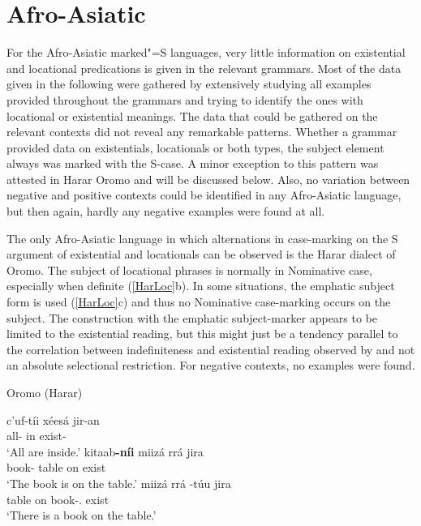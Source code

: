 \section{Afro-Asiatic}\label{ExistAfro}

For the Afro-Asiatic marked"=S languages, very little information on existential and locational predications is given in the relevant grammars. 
Most of the data given in the following were gathered by extensively studying all examples provided throughout the grammars and trying to identify the ones with locational or existential meanings.
The data that could be gathered on the relevant contexts did not reveal any remarkable patterns. 
Whether a grammar provided data on existentials, locationals or both types, the subject element always was marked with the S-case. 
A minor exception to this pattern was attested in Harar Oromo and will be discussed below.
Also, no variation between negative and positive contexts could be identified in any Afro-Asiatic language, but then again, hardly any negative examples were found at all.

The only Afro-Asiatic language in which alternations in case-marking on the S argument of existential and locationals can be observed is the Harar dialect of Oromo. 
The subject of locational phrases is normally in Nominative case, especially when definite (\ref{HarLoc}b). 
In some situations, the emphatic subject form is used (\ref{HarLoc}c) and thus no Nominative case-marking occurs on the subject. 
The construction with the emphatic subject-marker appears to be limited to the existential reading, but this might just be a tendency parallel to the correlation between indefiniteness and existential reading observed by \citet{Clark:1978} and not an absolute selectional restriction. 
For negative contexts, no examples were found.

\begin{exe}
\ex\label{HarLoc}  {Oromo (Harar)}  \citep[Eastern Cushitic; Ethiopia; ][101, 109]{Owens:1985}\nopagebreak[4] 
\begin{xlist}
\ex\gll c'uf-t\'ii x\'ees\'a jir-an\\
all-\nom{} in exist-\pl{}\\
\glt `All are inside.'
\ex \gll kitaab\textbf{-n\'ii} miiz\'a rr\'a jira\\
book-\nom{} table on exist\\
\glt `The book is on the table.'
\ex \gll miiz\'a rr\'a -t\'uu jira\\
table on book-\emphat.\sbj{} exist\\
\glt `There is a book on the table.' 
\end{xlist}
\end{exe}

